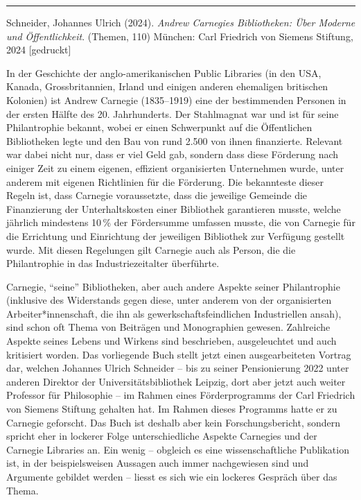 \documentclass[a4paper,
fontsize=11pt,
oneside,
numbers=noperiodatend,
parskip=half-,
bibliography=totoc,
final
]{scrartcl}
\begin{document}
\begin{center}\rule{0.5\linewidth}{0.5pt}\end{center}

Schneider, Johannes Ulrich (2024). \emph{Andrew Carnegies Bibliotheken:
Über Moderne und Öffentlichkeit}. (Themen, 110) München: Carl Friedrich
von Siemens Stiftung, 2024 {[}gedruckt{]}

In der Geschichte der anglo-amerikanischen Public Libraries (in den USA,
Kanada, Grossbritannien, Irland und einigen anderen ehemaligen
britischen Kolonien) ist Andrew Carnegie (1835--1919) eine der
bestimmenden Personen in der ersten Hälfte des 20. Jahrhunderts. Der
Stahlmagnat war und ist für seine Philantrophie bekannt, wobei er einen
Schwerpunkt auf die Öffentlichen Bibliotheken legte und den Bau von rund
2.500 von ihnen finanzierte. Relevant war dabei nicht nur, dass er viel
Geld gab, sondern dass diese Förderung nach einiger Zeit zu einem
eigenen, effizient organisierten Unternehmen wurde, unter anderem mit
eigenen Richtlinien für die Förderung. Die bekannteste dieser Regeln
ist, dass Carnegie voraussetzte, dass die jeweilige Gemeinde die
Finanzierung der Unterhaltskosten einer Bibliothek garantieren musste,
welche jährlich mindestens 10\,\% der Fördersumme umfassen musste, die
von Carnegie für die Errichtung und Einrichtung der jeweiligen
Bibliothek zur Verfügung gestellt wurde. Mit diesen Regelungen gilt
Carnegie auch als Person, die die Philantrophie in das
Industriezeitalter überführte.

Carnegie, \enquote{seine} Bibliotheken, aber auch andere Aspekte seiner
Philantrophie (inklusive des Widerstands gegen diese, unter anderem von
der organisierten Arbeiter*innenschaft, die ihn als
gewerkschaftsfeindlichen Industriellen ansah), sind schon oft Thema von
Beiträgen und Monographien gewesen. Zahlreiche Aspekte seines Lebens und
Wirkens sind beschrieben, ausgeleuchtet und auch kritisiert worden. Das
vorliegende Buch stellt jetzt einen ausgearbeiteten Vortrag dar, welchen
Johannes Ulrich Schneider -- bis zu seiner Pensionierung 2022 unter
anderen Direktor der Universitätsbibliothek Leipzig, dort aber jetzt
auch weiter Professor für Philosophie -- im Rahmen eines Förderprogramms
der Carl Friedrich von Siemens Stiftung gehalten hat. Im Rahmen dieses
Programms hatte er zu Carnegie geforscht. Das Buch ist deshalb aber kein
Forschungsbericht, sondern spricht eher in lockerer Folge
unterschiedliche Aspekte Carnegies und der Carnegie Libraries an. Ein
wenig -- obgleich es eine wissenschaftliche Publikation ist, in der
beispielsweisen Aussagen auch immer nachgewiesen sind und Argumente
gebildet werden -- liesst es sich wie ein lockeres Gespräch über das
Thema.
\end{document}
